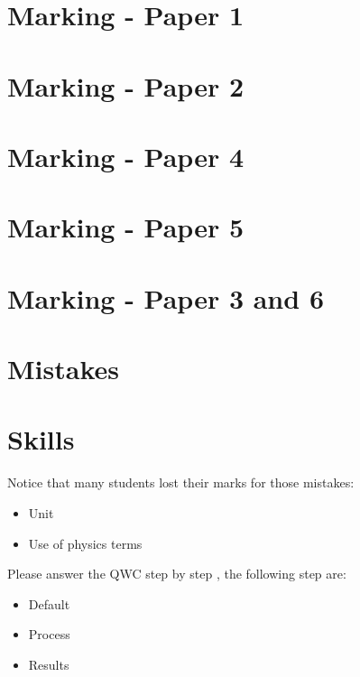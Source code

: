 \documentclass[a4paper]{article}
\begin{document}
\maketitle


\tableofcontents

\section{Marking - Paper 1}

\section{Marking - Paper 2}

\section{Marking - Paper 4}

\section{Marking - Paper 5}

\section{Marking - Paper 3 and 6}


\section{Mistakes}

\section{Skills}
\begin{prop}[Notices]
Notice that many students lost their marks for those mistakes:
\begin{itemize}
\item Unit
\item Use of physics terms
\end{itemize}

\end{prop}

\begin{prop}[QWC]
Please answer the QWC step by step , the following step are:
\begin{itemize}
\item Default
\item Process
\item Results
\end{itemize}
\end{prop}
\end{document}
